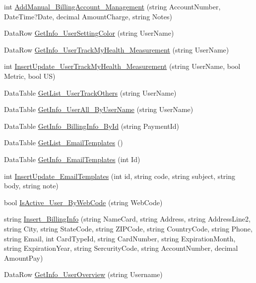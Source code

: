 \begin{DoxyCompactItemize}
int \hyperlink{class_d_b_class_a3d44f9f299daf15fecc7bd0cc3c6ab2f}{Add\-Manual\-\_\-\-Billing\-Account\-\_\-\-Management} (string Account\-Number, Date\-Time?Date, decimal Amount\-Charge, string Notes)
\item 
Data\-Row \hyperlink{class_d_b_class_ae02372dc18e31565b4831363761727ce}{Get\-Info\-\_\-\-User\-Setting\-Color} (string User\-Name)
\item 
Data\-Row \hyperlink{class_d_b_class_ab25c43efd861fb5974df1edc2983a64d}{Get\-Info\-\_\-\-User\-Track\-My\-Health\-\_\-\-Measurement} (string User\-Name)
\item 
int \hyperlink{class_d_b_class_a4568088b863f4eced0d05dc68a255f7d}{Insert\-Update\-\_\-\-User\-Track\-My\-Health\-\_\-\-Measurement} (string User\-Name, bool Metric, bool U\-S)
\item 
Data\-Table \hyperlink{class_d_b_class_ac1ac9c6415e1f9754d2b40c3bb1ed5e4}{Get\-List\-\_\-\-User\-Track\-Others} (string User\-Name)
\item 
Data\-Table \hyperlink{class_d_b_class_a7beb5ee76c22290fbd4105d939f6f1db}{Get\-Info\-\_\-\-User\-All\-\_\-\-By\-User\-Name} (string User\-Name)
\item 
Data\-Table \hyperlink{class_d_b_class_a2c851e40cf0bde4ad893668dea5f4c8a}{Get\-Info\-\_\-\-Billing\-Info\-\_\-\-By\-Id} (string Payment\-Id)
\item 
Data\-Table \hyperlink{class_d_b_class_a92d17fbc58b19d0706febb49eac3af0c}{Get\-List\-\_\-\-Email\-Templates} ()
\item 
Data\-Table \hyperlink{class_d_b_class_af38b686d7f8458e55251e3b5b3c554d4}{Get\-Info\-\_\-\-Email\-Templates} (int Id)
\item 
int \hyperlink{class_d_b_class_adfc194b09f95c76cda91e3876e717399}{Insert\-Update\-\_\-\-Email\-Templates} (int id, string code, string subject, string body, string note)
\item 
bool \hyperlink{class_d_b_class_ad9d03a94de073831692a0ba77d9971eb}{Is\-Active\-\_\-\-User\-\_\-\-By\-Web\-Code} (string Web\-Code)
\item 
string \hyperlink{class_d_b_class_a516612b7d6008c48982987c8526a789e}{Insert\-\_\-\-Billing\-Info} (string Name\-Card, string Address, string Address\-Line2, string City, string State\-Code, string Z\-I\-P\-Code, string Country\-Code, string Phone, string Email, int Card\-Type\-Id, string Card\-Number, string Expiration\-Month, string Expiration\-Year, string Sercurity\-Code, string Account\-Number, decimal Amount\-Pay)
\item 
Data\-Row \hyperlink{class_d_b_class_a0fa08325a7d843fa631763b708fc32be}{Get\-Info\-\_\-\-User\-Overview} (string Username)

\end{DoxyCompactItemize}
